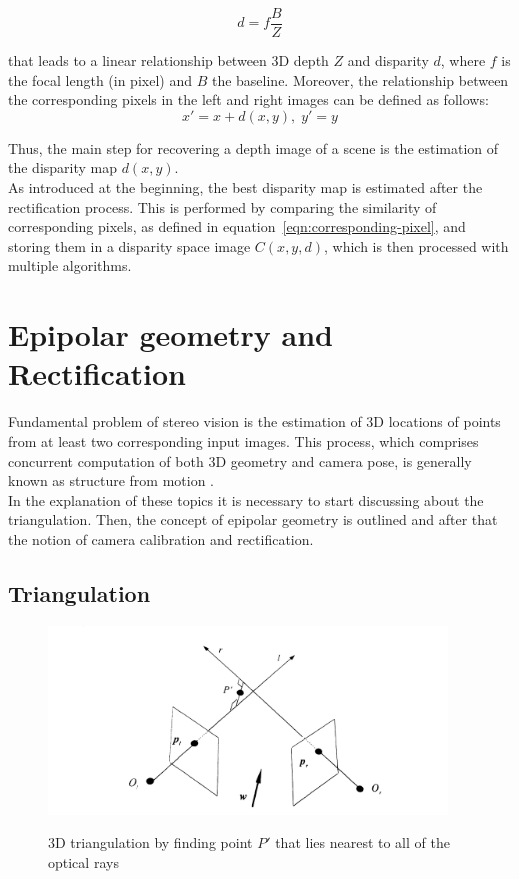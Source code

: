 \begin{equation} 
\label{eqn:disparity-depth}
	d = f \frac{B}{Z}
\end{equation}

that leads to a linear relationship between 3D depth $Z$ and disparity $d$, where $f$ is the focal length (in pixel) and $B$ the baseline.
Moreover, the relationship between the corresponding pixels in the left and right images can be defined as follows:
\begin{equation} 
\label{eqn:corresponding-pixel}
	x' = x + d(x, y), \; y' = y
\end{equation}

Thus, the main step for recovering a depth image of a scene is the estimation of the disparity map $d(x,y)$.\\
As introduced at the beginning, the best disparity map is estimated after the rectification process. 
This is performed by comparing the similarity of corresponding pixels, as defined in equation~\ref{eqn:corresponding-pixel}, and storing them in a disparity space image $C(x,y,d)$, which is then processed with multiple algorithms. 

\section{Epipolar geometry and Rectification}
\label{sec:eipolarandrect}

Fundamental problem of stereo vision is the estimation of 3D locations of points from at least two corresponding input images.
This process, which comprises concurrent computation of both 3D geometry and camera pose, is generally known as structure from motion \cite{Szeliski2011}.\\
In the explanation of these topics it is necessary to start discussing about the triangulation.
Then, the concept of epipolar geometry is outlined and after that the notion of camera calibration and rectification. 

\subsection{Triangulation}
\label{subsection:triangulation}

\begin{figure}[t]
	\begin{center}
		{\includegraphics[width=.8\textwidth, height=5cm, keepaspectratio]{images/triangulation}}
\caption{3D triangulation by finding point $P'$ that lies nearest to all of the optical rays}
\label{fig:triangulation}
	\end{center}
\end{figure}

